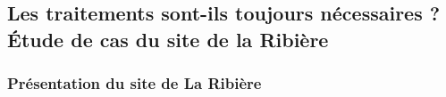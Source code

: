 \documentclass{article}
\newcommand{\blue}[1]{\textcolor{blue}{#1}} %
\begin{document}


\subsection{Les traitements sont-ils toujours nécessaires ? \\ Étude de cas du site de la Ribière}%

\subsubsection{Présentation du site de La Ribière}
\end{document}
